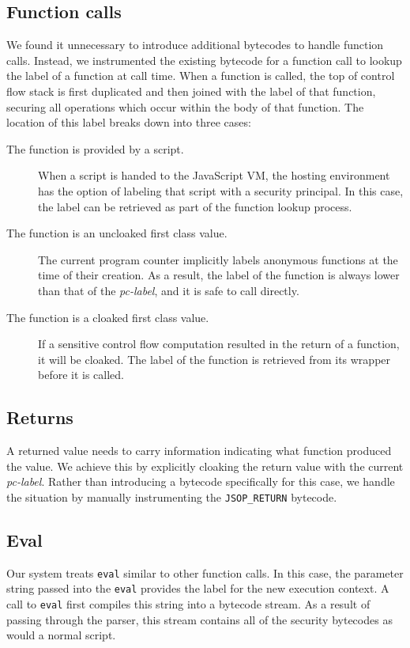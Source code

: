 \documentclass{llncs}
\begin{document}
\subsection{Function calls}
\label{sec:function-calls}
We found it unnecessary to introduce additional bytecodes to handle function calls.
Instead, we instrumented the existing bytecode for a function call to lookup the label of a function at call time.
When a function is called, the top of control flow stack is first duplicated and then joined with the label of that function, securing all operations which occur within the body of that function.
The location of this label breaks down into three cases:
\begin{description}
 \item [The function is provided by a script.]
  When a script is handed to the JavaScript VM, the hosting environment has the option of labeling that script with a security principal. In this case, the label can be retrieved as part of the function lookup process.
 \item [The function is an uncloaked first class value.]
  The current program counter implicitly labels anonymous functions at the time of their creation. As a result, the label of the function is always lower than that of the \textit{pc-label}, and it is safe to call directly.
 \item [The function is a cloaked first class value.]
  If a sensitive control flow computation resulted in the return of a function, it will be cloaked. The label of the function is retrieved from its wrapper before it is called.
\end{description}

\subsection{Returns}
\label{sec:early-returns}
A returned value needs to carry information indicating what function produced the value.
We achieve this by explicitly cloaking the return value with the current \textit{pc-label}.
Rather than introducing a bytecode specifically for this case, we handle the situation by manually instrumenting the \texttt{JSOP\_RETURN} bytecode.

\subsection{Eval}
\label{sec:eval}
Our system treats \texttt{eval} similar to other function calls.
In this case, the parameter string passed into the \texttt{eval} provides the label for the new execution context.
A call to \texttt{eval} first compiles this string into a bytecode stream.
As a result of passing through the parser, this stream contains all of the security bytecodes as would a normal script.
\end{document}
